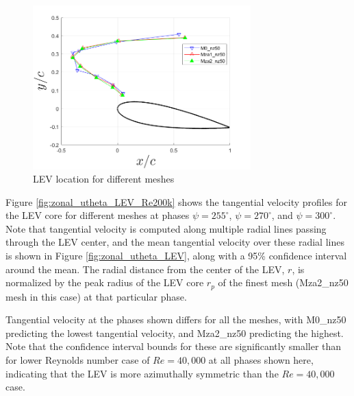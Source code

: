 \begin{figure}[H]
	\centering
	\includegraphics[width=0.75\textwidth]{figures/zonal_adapt_results/LEV_Re200k/LEV_location_Re200k}
	\caption{ LEV location for different meshes}
	\label{fig:zonal_LEV_location_Re200k}
\end{figure}

Figure \ref{fig:zonal_utheta_LEV_Re200k} shows the tangential velocity profiles for the LEV core for different meshes at phases  $\psi = 255^\circ$,  $\psi = 270^\circ$, and  $\psi = 300^\circ$. 
Note that tangential velocity is computed along multiple radial lines passing through the LEV center, and the mean tangential velocity over these radial lines is shown in Figure \ref{fig:zonal_utheta_LEV}, along with a 95\% confidence interval around the mean.
The radial distance from the center of the LEV, $r$, is normalized by the peak radius of the LEV core $r_p$ of the finest mesh (Mza2\_nz50 mesh in this case) at that particular phase.

Tangential velocity at the phases shown differs for all the meshes, with M0\_nz50 predicting the lowest tangential velocity, and Mza2\_nz50 predicting the highest.
Note that the confidence interval bounds for these are significantly smaller than for lower Reynolds number case of $Re=40,000$ at all phases shown here, indicating that the LEV is more azimuthally symmetric than the $Re=40,000$ case.


